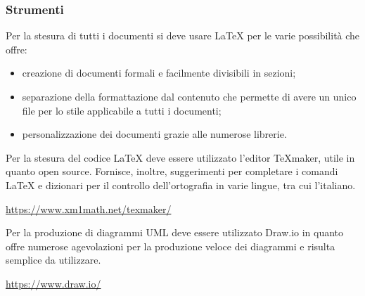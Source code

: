 \subsubsection{Strumenti}
\myparagraph{\LaTeX}
Per la stesura di tutti i documenti si deve usare \LaTeX{} per le varie possibilità che offre:
\begin{itemize}
\item creazione di documenti formali e facilmente divisibili in sezioni;
\item separazione della formattazione dal contenuto che permette di avere un unico file per lo stile applicabile a tutti i documenti;
\item personalizzazione dei documenti grazie alle numerose librerie.
\end{itemize}

Per la stesura del codice \LaTeX{} deve essere utilizzato l'editor \TeX maker, utile in quanto open source. Fornisce, inoltre, suggerimenti per completare i comandi \LaTeX{} e dizionari per il controllo dell'ortografia in varie lingue, tra cui l'italiano.
\begin{center}
\url{https://www.xm1math.net/texmaker/}
\end{center}

Per la produzione di diagrammi UML deve essere utilizzato Draw.io in quanto offre numerose agevolazioni per la produzione veloce dei diagrammi e risulta semplice da utilizzare.
\begin{center}
\url{https://www.draw.io/}
\end{center}